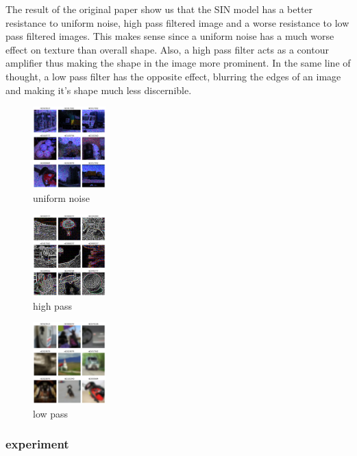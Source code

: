 \documentclass{article}
\begin{document}
The result of the original paper show us that the SIN model has a better resistance to uniform noise, high pass filtered image and a worse resistance to low pass filtered images.
This makes sense since a uniform noise has a much worse effect on texture than overall shape. Also, a high pass filter acts as a contour amplifier thus making the shape in the image more prominent. In the same line of thought, a low pass filter has the opposite effect, blurring the edges of an image and making it's shape much less discernible.

\begin{figure}[h!]
\centering
\includegraphics[width = 0.25\textwidth]{imgs/image_uniform}
\caption{uniform noise}
\end{figure}

\begin{figure}[h!]
\centering
\includegraphics[width = 0.25\textwidth]{imgs/image_high}
\caption{high pass}
\end{figure}

\begin{figure}[h!]
\centering
\includegraphics[width = 0.25\textwidth]{imgs/image_low}
\caption{low pass}

\end{figure}

\subsubsection{experiment}
\end{document}
